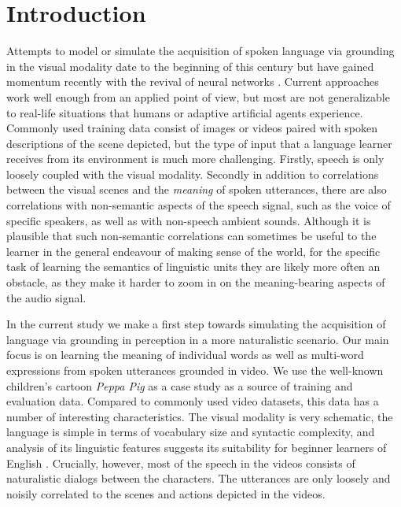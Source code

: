\section{Introduction}
\label{sec:intro}

Attempts to model or simulate the acquisition of spoken language via
grounding in the visual modality date to the beginning of this century
\citep{roypentland2002learning} but have gained momentum recently
with the revival of neural networks
\citep[e.g.][]{synnaeve2014learning,harwath2015deep,
  harwath2016unsupervised,chrupala-etal-2017-representations,alishahi-etal-2017-encoding,harwath2018jointly,Merkx2019,havard2019models,rouditchenko2020avlnet,khorrami_2021,peng2021fastslow}.
Current approaches work well enough from an applied point of view, 
but most are not generalizable to real-life situations that humans or 
adaptive artificial agents experience. Commonly used training data
consist of images or videos paired with spoken descriptions
of the scene depicted, but the type of input that a language learner receives 
from its environment is much more challenging.  Firstly, speech is only
loosely coupled with the visual modality. Secondly in addition to
correlations between the visual scenes and the {\it meaning} of spoken
utterances, there are also correlations with non-semantic aspects of
the speech signal, such as the voice of specific speakers, as well
as with non-speech ambient sounds. Although it is plausible that such
non-semantic correlations can sometimes be useful to the learner in
the general endeavour of making sense of the world, for the specific
task of learning the semantics of linguistic units they are likely more
often an obstacle, as they make it harder to zoom in on the
meaning-bearing aspects of the audio signal.

In the current study we make a first step towards simulating the
acquisition of language via grounding in perception in a more naturalistic
scenario.  Our main focus is on learning the meaning of individual words 
as well as multi-word expressions from spoken utterances grounded in video.  
We use the well-known children's cartoon {\it Peppa Pig} as
a case study as a source of training and evaluation data. Compared to
commonly used video datasets, this data has a number of interesting
characteristics.  The visual modality is very schematic,  the
language is simple in terms of vocabulary size and syntactic
complexity, and analysis of its linguistic features suggests its suitability for beginner learners of English \cite{kokla2021peppa,scheffler2021peppa}.
Crucially, however, most of the speech in the videos
consists of naturalistic dialogs between the characters. The
utterances are only loosely and noisily correlated to the scenes and
actions depicted in the videos.

